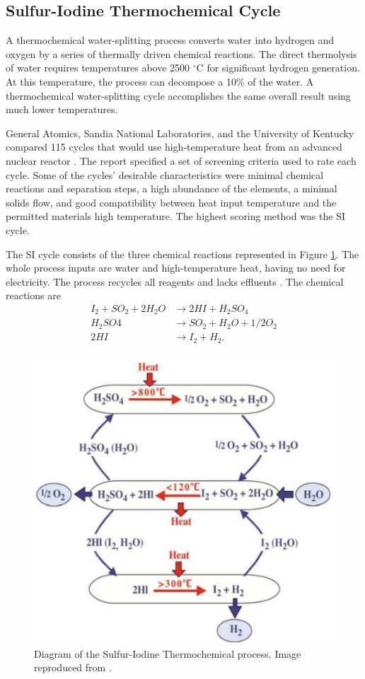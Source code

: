 \subsection{Sulfur-Iodine Thermochemical Cycle}

A thermochemical water-splitting process converts water into hydrogen and oxygen by a series of thermally driven chemical reactions.
The direct thermolysis of water requires temperatures above 2500 $^{\circ}$C for significant hydrogen generation.
At this temperature, the process can decompose a 10\% of the water.
A thermochemical water-splitting cycle accomplishes the same overall result using much lower temperatures.

General Atomics, Sandia National Laboratories, and the University of Kentucky compared 115 cycles that would use high-temperature heat from an advanced nuclear reactor \cite{brown_high_2003}.
The report specified a set of screening criteria used to rate each cycle.
Some of the cycles' desirable characteristics were minimal chemical reactions and separation steps, a high abundance of the elements, a minimal solids flow, and good compatibility between heat input temperature and the permitted materials high temperature.
The highest scoring method was the \gls{SI} cycle.

The \gls{SI} cycle consists of the three chemical reactions represented in Figure \ref{fig:sulfur1}.
The whole process inputs are water and high-temperature heat, having no need for electricity.
The process recycles all reagents and lacks effluents \cite{yildiz_efficiency_2006}.
The chemical reactions are
\begin{align}
	I_2 + SO_2 + 2H_2O &\rightarrow 2HI + H_2SO_4 \\
	H_2SO4 &\rightarrow SO_2 + H_2O + 1/2O_2 \\
	2HI &\rightarrow I_2 + H_2.
\end{align}

\begin{figure}[htbp!]
	\centering
	\includegraphics[width=0.5\linewidth]{figures-hydro/sulfur1.png}
	\hfill
	\caption{Diagram of the Sulfur-Iodine Thermochemical process. Image reproduced from \cite{benjamin_russ_sulfur_2009}.}
	\label{fig:sulfur1}
\end{figure}

